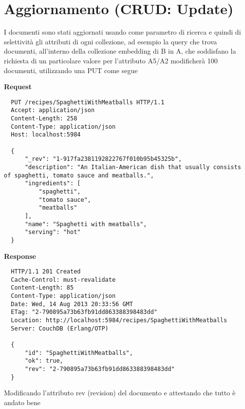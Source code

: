 \section{Aggiornamento (CRUD: Update)}

I documenti sono stati aggiornati usando come parametro di ricerca e quindi di selettività gli attributi di ogni collezione, ad esempio la query che 
trova documenti, all'interno della collezione embedding di B in A, che soddisfano la richiesta di un particolare valore per l'attributo A5/A2 
modificherà 100 documenti, utilizzando una PUT come segue 

\textbf{Request}
\begin{verbatim}
  PUT /recipes/SpaghettiWithMeatballs HTTP/1.1
  Accept: application/json
  Content-Length: 258
  Content-Type: application/json
  Host: localhost:5984

  {
      "_rev": "1-917fa2381192822767f010b95b45325b",
      "description": "An Italian-American dish that usually consists of spaghetti, tomato sauce and meatballs.",
      "ingredients": [
          "spaghetti",
          "tomato sauce",
          "meatballs"
      ],
      "name": "Spaghetti with meatballs",
      "serving": "hot"
  }
\end{verbatim}

\textbf{Response}

\begin{verbatim}
  HTTP/1.1 201 Created
  Cache-Control: must-revalidate
  Content-Length: 85
  Content-Type: application/json
  Date: Wed, 14 Aug 2013 20:33:56 GMT
  ETag: "2-790895a73b63fb91dd863388398483dd"
  Location: http://localhost:5984/recipes/SpaghettiWithMeatballs
  Server: CouchDB (Erlang/OTP)

  {
      "id": "SpaghettiWithMeatballs",
      "ok": true,
      "rev": "2-790895a73b63fb91dd863388398483dd"
  }
\end{verbatim}

Modificando l'attributo rev (revision) del documento e attestando che tutto è andato bene